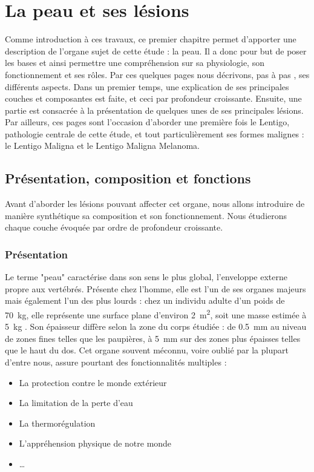 \renewcommand{\thechapter}{\arabic{chapter}}
\setcounter{chapter}{0}

\chapter{La peau et ses lésions}
\label{chap:chapter_1}
\chapterintro
Comme introduction à ces travaux, ce premier chapitre permet d'apporter une description de l'organe sujet de cette étude : la peau. Il a donc pour but de poser les bases et ainsi permettre une compréhension sur sa physiologie, son fonctionnement et ses rôles. Par ces quelques pages nous décrivons, pas à pas , ses différents aspects. Dans un premier temps, une explication de ses principales couches et composantes est faite, et ceci par profondeur croissante. Ensuite, une partie est consacrée à la présentation de quelques unes de ses principales lésions. Par ailleurs, ces pages sont l'occasion d'aborder une première fois le Lentigo, pathologie centrale de cette étude, et tout particulièrement ses formes malignes : le Lentigo Maligna et le Lentigo Maligna Melanoma.\par
\newpage

\section{Présentation, composition et fonctions}
Avant d’aborder les lésions pouvant affecter cet organe, nous allons introduire de manière synthétique sa composition et son fonctionnement. Nous étudierons chaque couche évoquée par ordre de profondeur croissante.\par

\subsection{Présentation}
Le terme "peau" caractérise dans son sens le plus global, l’enveloppe externe propre aux vertébrés. Présente chez l’homme, elle est l’un de ses organes majeurs mais également l’un des plus lourds : chez un individu adulte d’un poids de \SI{70}{\kilo\gram}, elle représente une surface plane d’environ \SI{2}{\metre\squared}, soit une masse estimée à \SI{5}{\kilo\gram} \cite{McGrath2010}. Son épaisseur diffère selon la zone du corps étudiée : de \SI{0,5}{\milli\metre} au niveau de zones fines telles que les paupières, à \SI{5}{\milli\metre} sur des zones plus épaisses telles que le haut du dos. Cet organe souvent méconnu, voire oublié par la plupart d’entre nous, assure pourtant des fonctionnalités multiples : 
\begin{itemize}
\item La protection contre le monde extérieur
\item La limitation de la perte d’eau
\item La thermorégulation
\item L’appréhension physique de notre monde
\item \ldots
\end{itemize}\par

